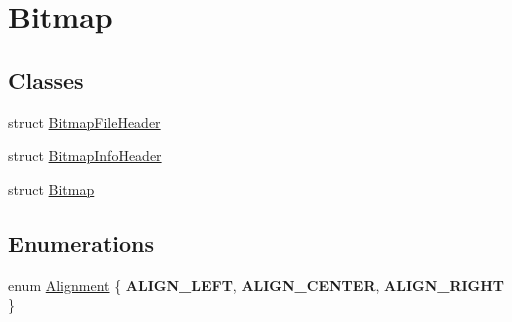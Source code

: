 \hypertarget{group__Bitmap}{}\section{Bitmap}
\label{group__Bitmap}
\subsection*{Classes}
\begin{DoxyCompactItemize}
\item 
struct \hyperlink{structBitmapFileHeader}{Bitmap\+File\+Header}
\item 
struct \hyperlink{structBitmapInfoHeader}{Bitmap\+Info\+Header}
\item 
struct \hyperlink{structBitmap}{Bitmap}
\end{DoxyCompactItemize}
\subsection*{Enumerations}
\begin{DoxyCompactItemize}
\item 
enum \hyperlink{group__Bitmap_gacdfaca60ec19c0265bac2692d7982726}{Alignment} \{ {\bfseries A\+L\+I\+G\+N\+\_\+\+L\+E\+FT}, 
{\bfseries A\+L\+I\+G\+N\+\_\+\+C\+E\+N\+T\+ER}, 
{\bfseries A\+L\+I\+G\+N\+\_\+\+R\+I\+G\+HT}
 \}
\end{DoxyCompactItemize}
